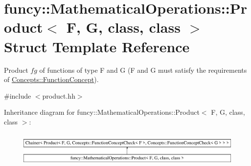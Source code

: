 \hypertarget{structfuncy_1_1MathematicalOperations_1_1Product}{\section{funcy\-:\-:Mathematical\-Operations\-:\-:Product$<$ F, G, class, class $>$ Struct Template Reference}
\label{structfuncy_1_1MathematicalOperations_1_1Product}
}


Product $fg$ of functions of type F and G (F and G must satisfy the requirements of \hyperlink{structfuncy_1_1Concepts_1_1FunctionConcept}{Concepts\-::\-Function\-Concept}).  




{\ttfamily \#include $<$product.\-hh$>$}

Inheritance diagram for funcy\-:\-:Mathematical\-Operations\-:\-:Product$<$ F, G, class, class $>$\-:\begin{figure}[H]
\begin{center}
\leavevmode
\includegraphics[height=1.728395cm]{structfuncy_1_1MathematicalOperations_1_1Product}
\end{center}
\end{figure}
